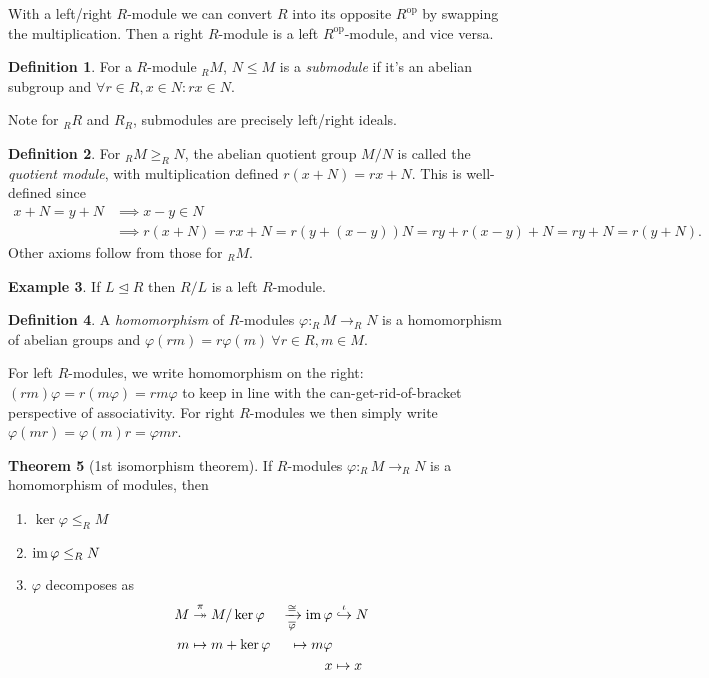 \documentclass[a4paper]{article}
\newcommand{\im}{\text{im\,}}
\theoremstyle{definition}
\newtheorem{defn}{Definition}[subsection]
\newtheorem{thm}[defn]{Theorem}
\newtheorem{example}[defn]{Example}
\begin{document}
With a left/right $R$-module we can convert $R$ into its opposite $R^\text{op}$ by swapping the multiplication. Then a right $R$-module is a left $R^\text{op}$-module, and vice versa.

\begin{defn}
For a $R$-module $_RM$, $N\leq M$ is a \textit{submodule} if it's an abelian subgroup and $\forall r\in R,x\in N:rx\in N$.

Note for $_RR$ and $R_R$, submodules are precisely left/right ideals.
\end{defn}

\begin{defn}
For $_RM\geq _RN$, the abelian quotient group $M/N$ is called the \textit{quotient module}, with multiplication defined $r(x+N)=rx+N$. This is well-defined since
\[
\begin{aligned}
x+N=y+N&\implies x-y\in N
\\&\implies r(x+N)=rx+N=r(y+(x-y))N=ry+r(x-y)+N=ry+N=r(y+N).
\end{aligned}
\]
Other axioms follow from those for $_RM$.
\end{defn}

\begin{example}
If $L\unlhd R$ then $R/L$ is a left $R$-module.
\end{example}

\begin{defn}
A \textit{homomorphism} of $R$-modules $\varphi: _RM \rightarrow _RN$ is a homomorphism of abelian groups and $\varphi(rm)=r\varphi(m) \ \forall r\in R, m\in M$.

For left $R$-modules, we write homomorphism on the right: $(rm)\varphi=r(m\varphi)=rm\varphi$ to keep in line with the can-get-rid-of-bracket perspective of associativity. For right $R$-modules we then simply write $\varphi(mr)=\varphi(m)r=\varphi mr$.
\end{defn}

\begin{thm}[1st isomorphism theorem]
If $R$-modules $\varphi:_RM\rightarrow _RN$ is a homomorphism of modules, then
\begin{enumerate}
\item $\ker\varphi\leq _RM$
\item $\im\varphi\leq _RN$
\item $\varphi$ decomposes as
\[
\begin{aligned}
M&\overset{\pi}\twoheadrightarrow M/\ker\varphi &\xrightarrow[\overline\varphi]{\cong} \im\varphi&\overset{\iota}\hookrightarrow N \\
m&\mapsto m+\ker\varphi &\mapsto m\varphi \\
&& x&\mapsto x
\end{aligned}
\]
\end{enumerate}
\end{thm}
\end{document}
